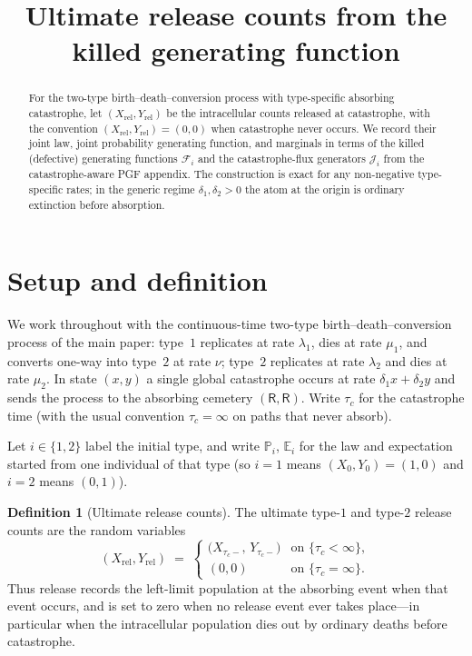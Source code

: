 \documentclass[11pt]{article}
\title{Ultimate release counts from the killed generating function}
\author{}
\date{}
\newcommand{\Prob}{\mathbb P}
\newcommand{\E}{\mathbb E}
\newcommand{\R}{\mathsf R}
\newcommand{\Xrel}{X_{\mathrm{rel}}}
\newcommand{\Yrel}{Y_{\mathrm{rel}}}
\theoremstyle{plain}
\theoremstyle{definition}
\newtheorem{definition}{Definition}
\theoremstyle{remark}
\begin{document}
\maketitle
\vspace{-1.5em}

\begin{abstract}
\noindent
For the two-type birth--death--conversion process with type-specific absorbing catastrophe, let
$(\Xrel,\Yrel)$ be the intracellular counts released at catastrophe, with the convention
$(\Xrel,\Yrel)=(0,0)$ when catastrophe never occurs.
We record their joint law, joint probability generating function, and marginals in terms of the
killed (defective) generating functions $\mathcal F_i$ and the catastrophe-flux generators
$\mathcal J_i$ from the catastrophe-aware PGF appendix.
The construction is exact for any non-negative type-specific rates; in the generic regime
$\delta_1,\delta_2>0$ the atom at the origin is ordinary extinction before absorption.
\end{abstract}

\section{Setup and definition}

We work throughout with the continuous-time two-type birth--death--conversion process of the main
paper: type~$1$ replicates at rate $\lambda_1$, dies at rate $\mu_1$, and converts one-way into
type~$2$ at rate $\nu$; type~$2$ replicates at rate $\lambda_2$ and dies at rate $\mu_2$.
In state $(x,y)$ a single global catastrophe occurs at rate $\delta_1x+\delta_2y$ and sends the
process to the absorbing cemetery $(\R,\R)$. Write $\tau_c$ for the catastrophe time
(with the usual convention $\tau_c=\infty$ on paths that never absorb).

Let $i\in\{1,2\}$ label the initial type, and write $\Prob_i$, $\E_i$ for the law and expectation
started from one individual of that type (so $i=1$ means $(X_0,Y_0)=(1,0)$ and $i=2$ means
$(0,1)$).

\begin{definition}[Ultimate release counts]
\label{def:release}
The ultimate type-$1$ and type-$2$ release counts are the random variables
\begin{equation}
\label{eq:release-def}
(\Xrel,\Yrel)
\;=\;
\begin{cases}
\bigl(X_{\tau_c-},\,Y_{\tau_c-}\bigr)
& \text{on }\{\tau_c<\infty\},\\[0.35em]
(0,0)
& \text{on }\{\tau_c=\infty\}.
\end{cases}
\end{equation}
Thus release records the left-limit population at the absorbing event when that event occurs, and
is set to zero when no release event ever takes place---in particular when the intracellular
population dies out by ordinary deaths before catastrophe.
\end{definition}
\end{document}
